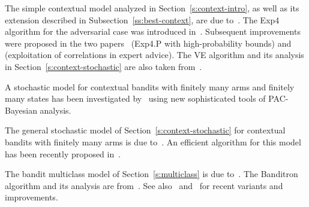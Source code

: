 The simple contextual model analyzed in Section~\ref{s:context-intro}, as well as its extension described in Subsection~\ref{ss:best-context}, are due to~\cite{maillard2011adaptive}. The Exp4 algorithm for the adversarial case was introduced in~\cite{ACFS03}. Subsequent improvements were proposed in the two papers~\cite{beygelzimer2011contextual} (Exp4.P with high-probability bounds) and~\cite{mcmahan2009tighter} (exploitation of correlations in expert advice). The VE algorithm and its analysis in Section~\ref{s:context-stochastic} are also taken from~\cite{beygelzimer2011contextual}.

A stochastic model for contextual bandits with finitely many arms and finitely many states has been investigated by~\cite{NIPS2011_0948} using new sophisticated tools of PAC-Bayesian analysis.

The general stochastic model of Section~\ref{s:context-stochastic} for contextual bandits with finitely many arms is due to~\cite{langford2007epoch}. An efficient algorithm for this model has been recently proposed in~\cite{dudik2011efficient}.

The bandit multiclass model of Section~\ref{s:multiclass} is due to~\cite{langford2007epoch}. The Banditron algorithm and its analysis are from~\cite{kakade2008efficient}. See also~\cite{crammer2011multiclass} and~\cite{hazan2011newtron} for recent variants and improvements.

